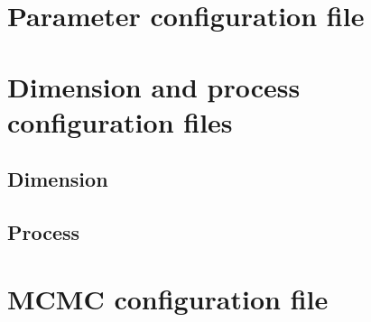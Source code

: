 \documentclass[a4paper]{article}
\begin{document}
	\section{Parameter configuration file}
	
	\section{Dimension and process configuration files}
	
	\subsection{Dimension}
	
	\subsection{Process}
	
	\section{MCMC configuration file}
	
\end{document}
